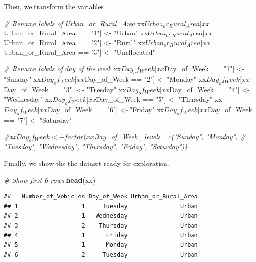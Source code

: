 \documentclass[]{article}
\newenvironment{Shaded}{\begin{snugshade}}{\end{snugshade}}
\newcommand{\KeywordTok}[1]{\textcolor[rgb]{0.13,0.29,0.53}{\textbf{{#1}}}}
\newcommand{\StringTok}[1]{\textcolor[rgb]{0.31,0.60,0.02}{{#1}}}
\newcommand{\CommentTok}[1]{\textcolor[rgb]{0.56,0.35,0.01}{\textit{{#1}}}}
\newcommand{\NormalTok}[1]{{#1}}
\begin{document}
Then, we transform the variables

\begin{Shaded}
\begin{Highlighting}[]
\CommentTok{# Rename labels of Urban_or_Rural_Area}
\NormalTok{xx$Urban_or_Rural_Area[xx$Urban_or_Rural_Area ==}\StringTok{ "1"}\NormalTok{] <-}\StringTok{ "Urban"}
\NormalTok{xx$Urban_or_Rural_Area[xx$Urban_or_Rural_Area ==}\StringTok{ "2"}\NormalTok{] <-}\StringTok{ "Rural"}
\NormalTok{xx$Urban_or_Rural_Area[xx$Urban_or_Rural_Area ==}\StringTok{ "3"}\NormalTok{] <-}\StringTok{ "Unallocated"}

\CommentTok{# Rename labels of day of the week}
\NormalTok{xx$Day_of_Week[xx$Day_of_Week ==}\StringTok{ "1"}\NormalTok{] <-}\StringTok{ "Sunday"}
\NormalTok{xx$Day_of_Week[xx$Day_of_Week ==}\StringTok{ "2"}\NormalTok{] <-}\StringTok{ "Monday"}
\NormalTok{xx$Day_of_Week[xx$Day_of_Week ==}\StringTok{ "3"}\NormalTok{] <-}\StringTok{ "Tuesday"}
\NormalTok{xx$Day_of_Week[xx$Day_of_Week ==}\StringTok{ "4"}\NormalTok{] <-}\StringTok{ "Wednesday"}
\NormalTok{xx$Day_of_Week[xx$Day_of_Week ==}\StringTok{ "5"}\NormalTok{] <-}\StringTok{ "Thursday"}
\NormalTok{xx$Day_of_Week[xx$Day_of_Week ==}\StringTok{ "6"}\NormalTok{] <-}\StringTok{ "Friday"}
\NormalTok{xx$Day_of_Week[xx$Day_of_Week ==}\StringTok{ "7"}\NormalTok{] <-}\StringTok{ "Saturday"}

\CommentTok{#xx$Day_of_Week  <- factor(xx$Day_of_Week , levels= c("Sunday", "Monday", }
\CommentTok{#    "Tuesday", "Wednesday", "Thursday", "Friday", "Saturday"))}
\end{Highlighting}
\end{Shaded}

Finally, we show the the dataset ready for exploration.

\begin{Shaded}
\begin{Highlighting}[]
\CommentTok{# Show first 6 rows}
\KeywordTok{head}\NormalTok{(xx)}
\end{Highlighting}
\end{Shaded}

\begin{verbatim}
##   Number_of_Vehicles Day_of_Week Urban_or_Rural_Area
## 1                  1     Tuesday               Urban
## 2                  1   Wednesday               Urban
## 3                  2    Thursday               Urban
## 4                  1      Friday               Urban
## 5                  1      Monday               Urban
## 6                  2     Tuesday               Urban
\end{verbatim}
\end{document}

